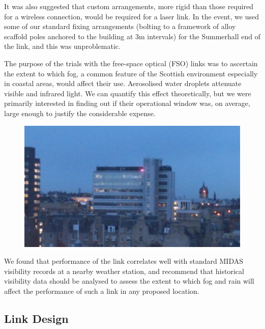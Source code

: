 \documentclass{amsart}
\begin{document}
It was also suggested that custom arrangements, more rigid than those
required for a wireless connection, would be required for a laser
link. In the event, we used some of our standard fixing arrangements
(bolting to a framework of alloy scaffold poles anchored to the
building at 3m intervals) for the Summerhall end of the link, and this
was unproblematic.

The purpose of the trials with the free-space optical (FSO) links was to
ascertain the extent to which fog, a common feature of the Scottish
environment especially in coastal areas, would affect their
use. Aerosolised water droplets attenuate visible and infrared
light. We can quantify this effect theoretically, but we were
primarily interested in finding out if their operational window was,
on average, large enough to justify the considerable expense.
\begin{figure}
  \includegraphics[width=\textwidth]{at-laser.jpg}
\end{figure}

We found that performance of the link correlates well with standard
MIDAS visibility records at a nearby weather station, and recommend
that historical visibility data should be analysed to assess the extent
to which fog and rain will affect the performance of such a link in
any proposed location.

\subsection{Link Design}
\label{sec:link-design}
\end{document}
